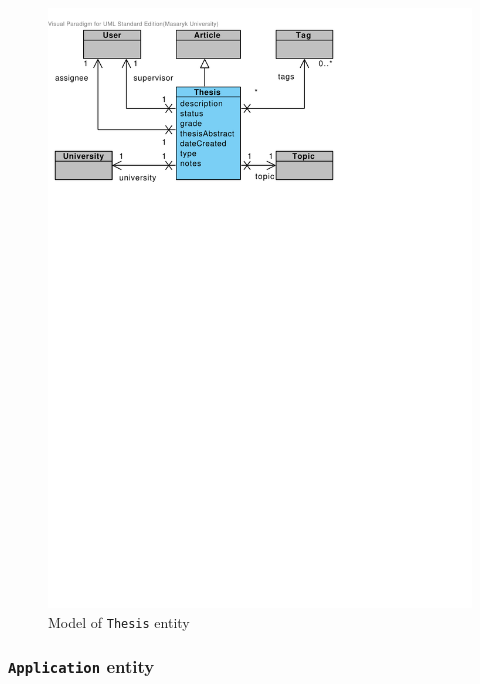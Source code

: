 \begin{figure}[h]
    \centering
        \includegraphics[trim=0 600 190 30, clip, keepaspectratio, width=\textwidth]{./images/domain-thesis-entity.pdf}
    \caption{Model of \texttt{Thesis} entity}
    \label{fig:domain-thesis-entity}
\end{figure}

\subsubsection{\texttt{Application} entity}

\faketext[1]

